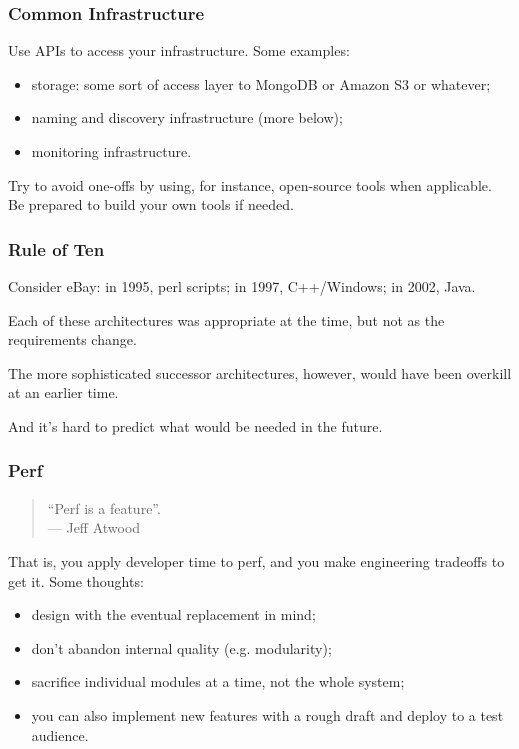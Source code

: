 \begin{frame}
\frametitle{Common Infrastructure}

Use APIs to access your infrastructure. Some examples:

\begin{itemize}
\item storage: some sort of access layer to MongoDB or Amazon S3 or whatever;
\item naming and discovery infrastructure (more below);
\item monitoring infrastructure.
\end{itemize}

Try to avoid one-offs by using, for instance, open-source tools when applicable.
Be prepared to build your own tools if needed.


\end{frame}



\begin{frame}
\frametitle{Rule of Ten}

Consider eBay: in 1995, perl scripts; in 1997, C++/Windows; in 2002,
Java.  

Each of these architectures was appropriate at the time, but
not as the requirements change. 

The more sophisticated successor
architectures, however, would have been overkill at an earlier
time. 

And it's hard to predict what would be needed in the future.

\end{frame}



\begin{frame}
\frametitle{Perf}

\begin{quote}
``Perf is a feature''.\\
\hfill --- Jeff Atwood
\end{quote}
That is, you apply developer time to perf, and you make engineering tradeoffs
to get it. Some thoughts:
\begin{itemize}
\item design with the eventual replacement in mind;
\item don't abandon internal quality (e.g. modularity);
\item sacrifice individual modules at a time, not the whole system;
\item you can also implement new features with a rough draft and deploy to a test audience.
\end{itemize}



\end{frame}




